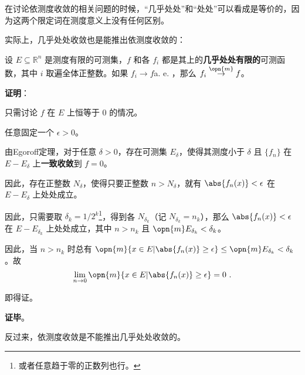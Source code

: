 在讨论依测度收敛的相关问题的时候，“几乎处处”和“处处”可以看成是等价的，因为这两个限定词在测度意义上没有任何区别。

实际上，几乎处处收敛也是能推出依测度收敛的：

\begin{theorem}{}\label{the_LimMs_1}

设 $E\subseteq \mathbb{R}^n$ 是测度有限的可测集，$f$ 和各 $f_i$ 都是其上的\textbf{几乎处处有限的}可测函数，其中 $i$ 取遍全体正整数。如果 $f_i\to f $a. e. ，那么 $f_i\overset{\opn{m}}\to f$。



\end{theorem}

\textbf{证明}：

只需讨论 $f$ 在 $E$ 上恒等于 $0$ 的情况。

任意固定一个 $\epsilon>0$。

由Egoroff定理，对于任意 $\delta>0$，存在可测集 $E_\delta$，使得其测度小于 $\delta$ 且 $\{f_n\}$ 在 $E-E_\delta$ 上\textbf{一致收敛}到 $f=0$。

因此，存在正整数 $N_\delta$，使得只要正整数 $n>N_\delta$，就有 $\abs{f_n(x)}<\epsilon$ 在 $E-E_\delta$ 上处处成立。

因此，只需要取 $\delta_k=1/2^k$\footnote{或者任意趋于零的正数列也行。}，得到各 $N_{\delta_k}$（记 $N_{\delta_k}=n_k$），那么 $\abs{f_{n}(x)}<\epsilon$ 在 $E-E_{\delta_k}$ 上处处成立，其中 $n>n_k$ 且 $\opn{m}E_{\delta_k}<{\delta_k}$。

因此，当 $n>n_k$ 时总有 $\opn{m}\{x\in E|\abs{f_n(x)}\geq\epsilon\}\leq\opn{m}E_{\delta_k}<\delta_k$。故
\begin{equation}
\lim\limits_{n\to 0}\opn{m}\{x\in E|\abs{f_n(x)}\geq\epsilon\}=0~.
\end{equation}

即得证。

\textbf{证毕}。


反过来，依测度收敛是不能推出几乎处处收敛的。

